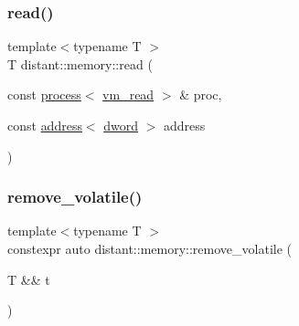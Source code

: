 \mbox{\label{namespacedistant_1_1memory_abf084cc29320d1031fd87b0daa6820e1}} 
\subsubsection{\texorpdfstring{read()}{read()}\hspace{0.1cm}{\footnotesize\ttfamily [2/2]}}
{\footnotesize\ttfamily template$<$typename T $>$ \\
T distant\+::memory\+::read (\begin{DoxyParamCaption}\item[{const \mbox{\hyperlink{classdistant_1_1kernel__objects_1_1process}{process}}$<$ \mbox{\hyperlink{namespacedistant_a671e87e004e808bfc0d54a4e816981df}{vm\+\_\+read}} $>$ \&}]{proc,  }\item[{const \mbox{\hyperlink{classdistant_1_1memory_1_1address}{address}}$<$ \mbox{\hyperlink{namespacedistant_a9fa41a5a1a17dcbd24da1c1855c92489}{dword}} $>$}]{address }\end{DoxyParamCaption})}

\mbox{\label{namespacedistant_1_1memory_a796f3ecce5e93dc03cd01f2894fa4aba}} 
\subsubsection{\texorpdfstring{remove\+\_\+volatile()}{remove\_volatile()}}
{\footnotesize\ttfamily template$<$typename T $>$ \\
constexpr auto distant\+::memory\+::remove\+\_\+volatile (\begin{DoxyParamCaption}\item[{T \&\&}]{t }\end{DoxyParamCaption})}

\mbox{\label{namespacedistant_1_1memory_a9a400d3aaa98b8153eb0876ef216cae6}} 
